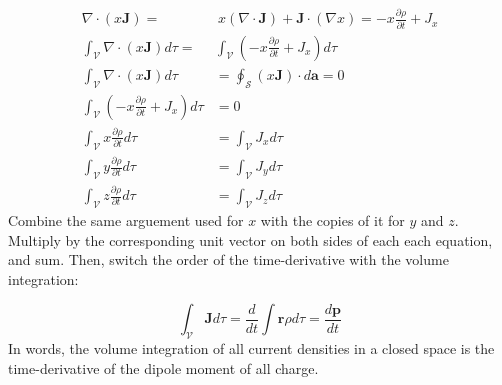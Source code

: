 \documentclass[10pt]{article}
\begin{document}
\begin{align}
\nabla \cdot (x \mathbf{J}) =& ~ x (\nabla \cdot \mathbf{J}) + \mathbf{J} \cdot (\nabla x) = -x \frac{\partial \rho}{\partial t} + J_x \\
\int_{\mathcal{V}} \nabla \cdot (x \mathbf{J}) d\tau =& \int_{\mathcal{V}} \left( -x \frac{\partial \rho}{\partial t} + J_x \right) d\tau \\
\int_{\mathcal{V}} \nabla \cdot (x \mathbf{J}) d\tau &= \oint_{\mathcal{S}} (x \mathbf{J}) \cdot d\mathbf{a} = 0 \\
\int_{\mathcal{V}} \left( -x \frac{\partial \rho}{\partial t} + J_x \right) d\tau &= 0 \\
\int_{\mathcal{V}} x \frac{\partial \rho}{\partial t} d\tau &= \int_{\mathcal{V}} J_x d\tau \\
\int_{\mathcal{V}} y \frac{\partial \rho}{\partial t} d\tau &= \int_{\mathcal{V}} J_y d\tau \\
\int_{\mathcal{V}} z \frac{\partial \rho}{\partial t} d\tau &= \int_{\mathcal{V}} J_z d\tau
\end{align}
\noindent
Combine the same arguement used for $x$ with the copies of it for $y$ and $z$.  Multiply by the corresponding unit vector on both sides of each each equation, and sum.  Then, switch the order of the time-derivative with the volume integration:

\begin{equation}
\int_\mathcal{V} \mathbf{J} d\tau = \frac{d}{dt}\int \mathbf{r} \rho d\tau = \frac{d\mathbf{p}}{dt}
\end{equation}
\noindent
In words, the volume integration of all current densities in a closed space is the time-derivative of the dipole moment of all charge.
\end{document}
